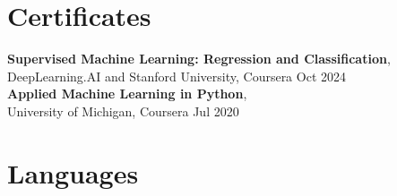\documentclass[a4paper,10pt]{article}
\newcommand{\resumeItem}[1]{\item #1}
\newcommand{\resumeSubheading}[4]{
    \textbf{#1} \hfill #2 \\
    \textit{#3} \hfill \textit{#4}
}
\begin{document}







\section*{Certificates}

\textbf{Supervised Machine Learning: Regression and Classification},\\
DeepLearning.AI and Stanford University, Coursera 
\hfill Oct 2024 \\
\textbf{Applied Machine Learning in Python},\\
University of Michigan, Coursera 
\hfill Jul 2020


\section*{Languages}
\end{document}
